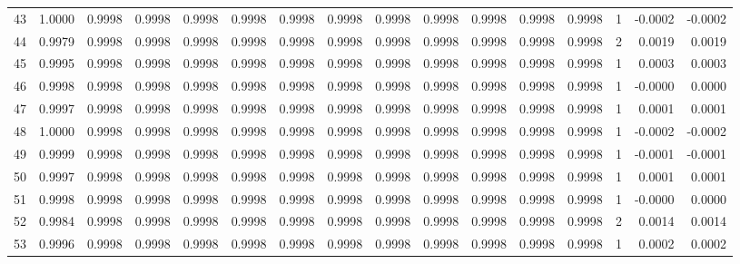 \begin{tabular}{lrrrrrrrrrrrrrrr}
43  &      1.0000 &  0.9998 &  0.9998 &  0.9998 &  0.9998 &  0.9998 &  0.9998 &  0.9998 &  0.9998 &  0.9998 &   0.9998 &     0.9998 &      1 &                   -0.0002 &                    -0.0002 \\
44  &      0.9979 &  0.9998 &  0.9998 &  0.9998 &  0.9998 &  0.9998 &  0.9998 &  0.9998 &  0.9998 &  0.9998 &   0.9998 &     0.9998 &      2 &                    0.0019 &                     0.0019 \\
45  &      0.9995 &  0.9998 &  0.9998 &  0.9998 &  0.9998 &  0.9998 &  0.9998 &  0.9998 &  0.9998 &  0.9998 &   0.9998 &     0.9998 &      1 &                    0.0003 &                     0.0003 \\
46  &      0.9998 &  0.9998 &  0.9998 &  0.9998 &  0.9998 &  0.9998 &  0.9998 &  0.9998 &  0.9998 &  0.9998 &   0.9998 &     0.9998 &      1 &                   -0.0000 &                     0.0000 \\
47  &      0.9997 &  0.9998 &  0.9998 &  0.9998 &  0.9998 &  0.9998 &  0.9998 &  0.9998 &  0.9998 &  0.9998 &   0.9998 &     0.9998 &      1 &                    0.0001 &                     0.0001 \\
48  &      1.0000 &  0.9998 &  0.9998 &  0.9998 &  0.9998 &  0.9998 &  0.9998 &  0.9998 &  0.9998 &  0.9998 &   0.9998 &     0.9998 &      1 &                   -0.0002 &                    -0.0002 \\
49  &      0.9999 &  0.9998 &  0.9998 &  0.9998 &  0.9998 &  0.9998 &  0.9998 &  0.9998 &  0.9998 &  0.9998 &   0.9998 &     0.9998 &      1 &                   -0.0001 &                    -0.0001 \\
50  &      0.9997 &  0.9998 &  0.9998 &  0.9998 &  0.9998 &  0.9998 &  0.9998 &  0.9998 &  0.9998 &  0.9998 &   0.9998 &     0.9998 &      1 &                    0.0001 &                     0.0001 \\
51  &      0.9998 &  0.9998 &  0.9998 &  0.9998 &  0.9998 &  0.9998 &  0.9998 &  0.9998 &  0.9998 &  0.9998 &   0.9998 &     0.9998 &      1 &                   -0.0000 &                     0.0000 \\
52  &      0.9984 &  0.9998 &  0.9998 &  0.9998 &  0.9998 &  0.9998 &  0.9998 &  0.9998 &  0.9998 &  0.9998 &   0.9998 &     0.9998 &      2 &                    0.0014 &                     0.0014 \\
53  &      0.9996 &  0.9998 &  0.9998 &  0.9998 &  0.9998 &  0.9998 &  0.9998 &  0.9998 &  0.9998 &  0.9998 &   0.9998 &     0.9998 &      1 &                    0.0002 &                     0.0002 \\

\end{tabular}
